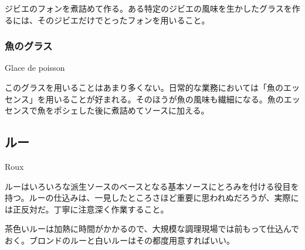 \begin{recette}
ジビエのフォンを煮詰めて作る。ある特定のジビエの風味を生かしたグラスを作るには、そのジビエだけでとったフォンを用いること。

\atoaki{}

\hypertarget{glace-de-poisson}{%
\subsubsection{魚のグラス}\label{glace-de-poisson}}

\begin{frsubenv}

Glace de poisson

\end{frsubenv}


このグラスを用いることはあまり多くない。日常的な業務においては「魚のエッセンス」を用いることが好まれる。そのほうが魚の風味も繊細になる。魚のエッセンスで魚をポシェした後に煮詰めてソースに加える。

 

\end{recette}

\begin{main}

\hypertarget{roux}{%
\section{ルー}\label{roux}}

\begin{frsecenv}

Roux

\end{frsecenv}

 

ルーはいろいろな派生ソースのベースとなる基本ソースにとろみを付ける役目を持つ。ルーの仕込みは、一見したところさほど重要に思われぬだろうが、実際には正反対だ。丁寧に注意深く作業すること。

茶色いルーは加熱に時間がかかるので、大規模な調理現場では前もって仕込んでおく。ブロンドのルーと白いルーはその都度用意すればいい。

\atoaki{}

\end{main}

